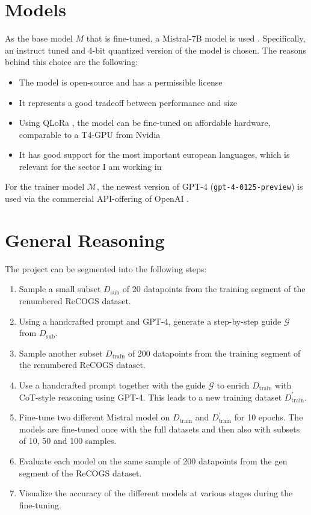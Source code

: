 \documentclass[11pt]{article}
\begin{document}
    \section{Models}

    As the base model $M$ that is fine-tuned, a Mistral-7B model is used \cite{jiang_mistral_2023}.
    Specifically, an instruct tuned and 4-bit quantized version of the model is chosen.
    The reasons behind this choice are the following:
    \begin{itemize}
        \item The model is open-source and has a permissible license
        \item It represents a good tradeoff between performance and size
        \item Using QLoRa \cite{dettmers_qlora_2023}, the model can be fine-tuned on affordable hardware, comparable to a T4-GPU from Nvidia
        \item It has good support for the most important european languages, which is relevant for the sector I am working in
    \end{itemize}

    For the trainer model $\mathcal{M}$, the newest version of GPT-4 (\texttt{gpt-4-0125-preview}) is used via the
    commercial API-offering of OpenAI \cite{openai_gpt-4_2024}.


    \section{General Reasoning}\label{S:reasoning}

    The project can be segmented into the following steps:

    \begin{enumerate}
        \item Sample a small subset $D_\mathrm{sub}$ of 20 datapoints from the training segment of the renumbered ReCOGS dataset.
        \item Using a handcrafted prompt and GPT-4, generate a step-by-step guide $\mathcal{G}$ from $D_\mathrm{sub}$.
        \item Sample another subset $D_\mathrm{train}$ of 200 datapoints from the training segment of the renumbered ReCOGS dataset.
        \item Use a handcrafted prompt together with the guide $\mathcal{G}$ to enrich $D_\mathrm{train}$
        with CoT-style reasoning using GPT-4. This leads to a new training dataset $D_\mathrm{train}^\prime$.
        \item Fine-tune two different Mistral model on $D_\mathrm{train}$ and $D_\mathrm{train}^\prime$ for 10 epochs.
        The models are fine-tuned once with the full datasets and then also with subsets of 10, 50 and 100 samples.
        \item Evaluate each model on the same sample of 200 datapoints from the gen segment of the ReCOGS dataset.
        \item Visualize the accuracy of the different models at various stages during the fine-tuning.
    \end{enumerate}
\end{document}

